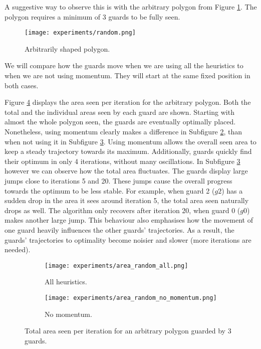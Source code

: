 A suggestive way to observe this is with the arbitrary polygon from Figure \ref{fig:random}. The polygon requires a minimum of 3 guards to be fully seen.

\begin{figure}[h!]
    \centering
    \texttt{[image: experiments/random.png]}
    \caption{Arbitrarily shaped polygon.}
    \label{fig:random}
\end{figure}

We will compare how the guards move when we are using all the heuristics to when we are not using momentum. They will start at the same fixed position in both cases.

Figure \ref{fig:no_momentum} displays the area seen per iteration for the arbitrary polygon. Both the total and the individual areas seen by each guard are shown. Starting with almost the whole polygon seen, the guards are eventually optimally placed. Nonetheless, using momentum clearly makes a difference in Subfigure \ref{fig:no_momentum1}, than when not using it in Subfigure \ref{fig:no_momentum2}. Using momentum allows the overall seen area to keep a steady trajectory towards its maximum. Additionally, guards quickly find their optimum in only 4 iterations, without many oscillations. In Subfigure \ref{fig:no_momentum2} however we can observe how the total area fluctuates. The guards display large jumps close to iterations 5 and 20. These jumps cause the overall progress towards the optimum to be less stable. For example, when guard 2 ($g2$) has a sudden drop in the area it sees around iteration 5, the total area seen naturally drops as well. The algorithm only recovers after iteration 20, when guard 0 ($g0$) makes another large jump. This behaviour also emphasises how the movement of one guard heavily influences the other guards' trajectories. As a result, the guards' trajectories to optimality become noisier and slower (more iterations are needed).


\begin{figure}[h!]
    \centering
    \begin{subfigure}{0.45\textwidth}
        \texttt{[image: experiments/area\_random\_all.png]}
        \caption{All heuristics.}
        \label{fig:no_momentum1}
    \end{subfigure}
    \begin{subfigure}{0.45\textwidth}
        \texttt{[image: experiments/area\_random\_no\_momentum.png]}
        \caption{No momentum.}
        \label{fig:no_momentum2}
    \end{subfigure}
    \caption{Total area seen per iteration for an arbitrary polygon guarded by 3 guards.}
    \label{fig:no_momentum}
\end{figure}

